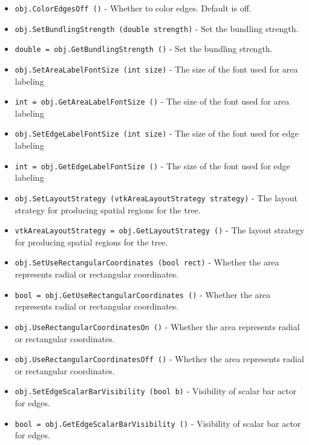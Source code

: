 \begin{itemize}
\item  \verb|obj.ColorEdgesOff ()| -  Whether to color edges.  Default is off.

\item  \verb|obj.SetBundlingStrength (double strength)| -  Set the bundling strength.

\item  \verb|double = obj.GetBundlingStrength ()| -  Set the bundling strength.

\item  \verb|obj.SetAreaLabelFontSize (int size)| -  The size of the font used for area labeling

\item  \verb|int = obj.GetAreaLabelFontSize ()| -  The size of the font used for area labeling

\item  \verb|obj.SetEdgeLabelFontSize (int size)| -  The size of the font used for edge labeling

\item  \verb|int = obj.GetEdgeLabelFontSize ()| -  The size of the font used for edge labeling

\item  \verb|obj.SetLayoutStrategy (vtkAreaLayoutStrategy strategy)| -  The layout strategy for producing spatial regions for the tree.

\item  \verb|vtkAreaLayoutStrategy = obj.GetLayoutStrategy ()| -  The layout strategy for producing spatial regions for the tree.

\item  \verb|obj.SetUseRectangularCoordinates (bool rect)| -  Whether the area represents radial or rectangular coordinates.

\item  \verb|bool = obj.GetUseRectangularCoordinates ()| -  Whether the area represents radial or rectangular coordinates.

\item  \verb|obj.UseRectangularCoordinatesOn ()| -  Whether the area represents radial or rectangular coordinates.

\item  \verb|obj.UseRectangularCoordinatesOff ()| -  Whether the area represents radial or rectangular coordinates.

\item  \verb|obj.SetEdgeScalarBarVisibility (bool b)| -  Visibility of scalar bar actor for edges.

\item  \verb|bool = obj.GetEdgeScalarBarVisibility ()| -  Visibility of scalar bar actor for edges.

\end{itemize}
